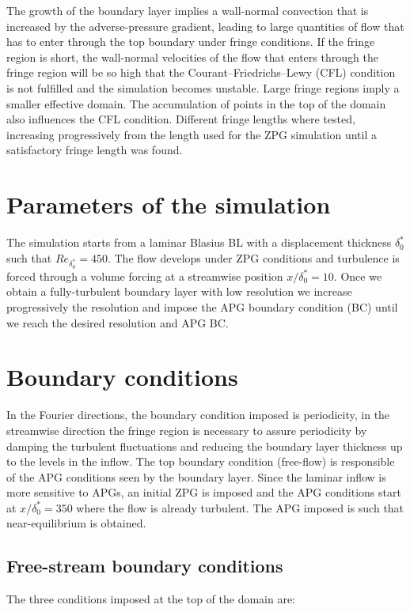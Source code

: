The growth of the boundary layer implies a wall-normal convection that is increased by the adverse-pressure gradient, leading to large quantities of flow that has to enter through the top boundary under fringe conditions.
If the fringe region is short, the wall-normal velocities of the flow that enters through the fringe region will be so high that the Courant–Friedrichs–Lewy (CFL) condition is not fulfilled and the simulation becomes unstable.
Large fringe regions imply a smaller effective domain.
The accumulation of points in the top of the domain also influences the CFL condition. Different fringe lengths where tested, increasing progressively from the length used for the ZPG simulation until a satisfactory fringe length was found.

\section{Parameters of the simulation} \label{subsec:Param_sim}
The simulation starts from a laminar Blasius BL with a displacement thickness $\delta^*_0$ such that $Re_{\delta_0^*}=450$. The flow develops under ZPG conditions and turbulence is forced through a volume forcing \citep{schlatter_orlu_2012} at a streamwise position $x/\delta^*_0=10$.
Once we obtain a fully-turbulent boundary layer with low resolution we increase progressively the resolution and impose the APG boundary condition (BC) until we reach the desired resolution and APG BC.

\section{Boundary conditions} \label{subsec:BC}

In the Fourier directions, the boundary condition imposed is periodicity, in the streamwise direction the fringe region is necessary to assure periodicity by damping the turbulent fluctuations and reducing the boundary layer thickness up to the levels in the inflow.
The top boundary condition (free-flow) is responsible of the APG conditions seen by the boundary layer.
Since the laminar inflow is more sensitive to APGs, an initial ZPG is imposed and the APG conditions start at $x/\delta^*_0 = 350$ where the flow is already turbulent.
The APG imposed is such that near-equilibrium is obtained.

\subsection{Free-stream boundary conditions}
The three conditions imposed at the top of the domain are:

